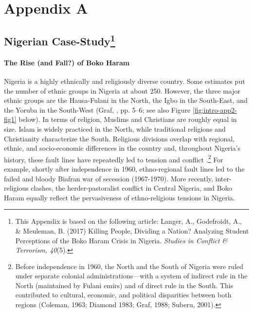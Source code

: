 
\chapter[Appendix A]{Appendix A}

\section[Nigerian Case-Study]{Nigerian Case-Study\footnote{This Appendix is based on the following article: Langer, A., Godefroidt, A., \& Meuleman, B. (2017) Killing People, Dividing a Nation? Analyzing Student Perceptions of the Boko Haram Crisis in Nigeria. \textit{Studies in Conflict \& Terrorism, 40}(5).}}
\label{app:A1}

\subsubsection*{The Rise (and Fall?) of Boko Haram}

Nigeria is a highly ethnically and religiously diverse country. Some estimates put the number of ethnic groups in Nigeria at about 250. However, the three major ethnic groups are the Hausa-Fulani in the North, the Igbo in the South-East, and the Yoruba in the South-West (Graf, \citeyear{Graf1988}, pp. 5–6; see also Figure \ref{fig:intro-app2-fig1} below). In terms of religion, Muslims and Christians are roughly equal in size. Islam is widely practiced in the North, while traditional religions and Christianity characterize the South. Religious divisions overlap with regional, ethnic, and socio-economic differences in the country \citep{Langer2017c} and, throughout Nigeria’s history, these fault lines have repeatedly led to tension and conflict \citep{Suberu2001}.\footnote{Before independence in 1960, the North and the South of Nigeria were ruled under separate colonial administrations—with a system of indirect rule in the North (maintained by Fulani emirs) and of direct rule in the South. This contributed to cultural, economic, and political disparities between both regions (Coleman, 1963; Diamond 1983; Graf, 1988; Suberu, 2001).} For example, shortly after independence in 1960, ethno-regional fault lines led to the failed and bloody Biafran war of secession (1967-1970). More recently, inter-religious clashes, the herder-pastoralist conflict in Central Nigeria, and Boko Haram equally reflect the pervasiveness of ethno-religious tensions in Nigeria.


